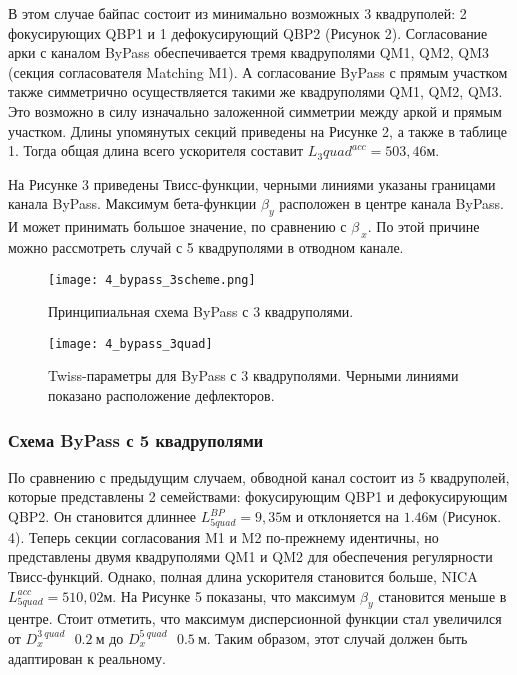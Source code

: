 \par В этом случае байпас состоит из минимально возможных 3 квадруполей: 2 фокусирующих QBP1 и 1 дефокусирующий QBP2 (Рисунок 2). Согласование арки с каналом ByPass обеспечивается тремя квадруполями QM1, QM2, QM3 (секция согласователя Matching M1). А согласование ByPass с прямым участком также симметрично осуществляется такими же квадруполями QM1, QM2, QM3. Это возможно в силу изначально заложенной симметрии между аркой и прямым участком. Длины упомянутых секций приведены на Рисунке 2, а также в таблице 1. Тогда общая длина всего ускорителя составит $L{_3quad^{acc}}=503,46 м$.
\par На Рисунке 3 приведены Твисс-функции, черными линиями указаны границами канала ByPass. Максимум бета-функции $\beta_y$ расположен в центре канала ByPass. И может принимать большое значение, по сравнению с $\beta_{\ x}$. По этой причине можно рассмотреть случай с 5 квадруполями в отводном канале.

\begin{figure}[!h]
  \centering
   \texttt{[image: 4\_bypass\_3scheme.png]}
   \caption{Принципиальная схема ByPass с 3 квадруполями.}
   \label{fig:4_bypass_3scheme}
\end{figure}

\begin{figure}[!h]
  \centering
   \texttt{[image: 4\_bypass\_3quad]}
   \caption{Twiss-параметры для ByPass с 3 квадруполями. Черными линиями показано расположение дефлекторов.}
   \label{fig:4_bypass_3quad}
\end{figure}

\subsubsection{Схема ByPass с 5 квадруполями}\label{sec:EDM/Wien_filter/ByPass/5quad}

По сравнению с предыдущим случаем, обводной канал состоит из 5 квадруполей, которые представлены 2 семействами: фокусирующим QBP1 и дефокусирующим QBP2. Он становится длиннее $L_{5quad}^{BP}=9,35 м$ и отклоняется на $1.46 м$ (Рисунок. 4). Теперь секции согласования M1 и M2 по-прежнему идентичны, но представлены двумя квадруполями QM1 и QM2 для обеспечения регулярности Твисс-функций. Однако, полная длина ускорителя становится больше, NICA $L_{5quad}^{acc}=510,02 м$. На Рисунке 5 показаны, что максимум $\beta_y$ становится меньше в центре. Стоит отметить, что максимум дисперсионной функции стал увеличился от $D_x^{3\ quad}\ ~\ 0.2\ м$ до $D_x^{5\ quad}\ ~\ 0.5\ м$. Таким образом, этот случай должен быть адаптирован к реальному.

